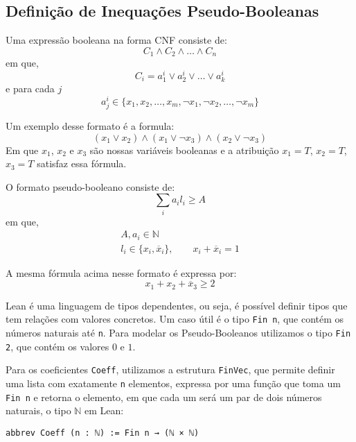 \documentclass[conference]{IEEEtran}
\begin{document}

\subsection{Definição de Inequações Pseudo-Booleanas}
Uma expressão booleana na forma CNF consiste de:
\begin{equation}
    C_1 \land C_2 \land \dots \land C_n
\end{equation}
em que,
\begin{equation}
    C_i = a_1^i \lor a_2^i \lor \dots \lor a_k^i
\end{equation}
e para cada $j$
\begin{equation}
    a_j^i \in \{ x_1,x_2,\dots,x_m,\neg x_1,\neg x_2,\dots, \neg x_m \}
\end{equation}

Um exemplo desse formato é a formula:
\begin{equation}
    (x_1 \lor x_2) \land (x_1 \lor \neg x_3) \land (x_2 \lor \neg x_3)
\end{equation}
Em que $x_1$, $x_2$ e $x_3$ são nossas variáveis booleanas e a atribuição $x_1=T$, $x_2=T$, $x_3=T$ satisfaz essa fórmula.

O formato pseudo-booleano consiste de:
\begin{equation}
    \sum_i{a_i l_i} \ge A
\end{equation}
em que,
\begin{equation}
    \begin{gathered}
        A, a_i \in \mathbb{N} \\
        l_i \in \{ x_i, \overline x_i \}, \qquad x_i + \overline x_i = 1
    \end{gathered}
\end{equation}

A mesma fórmula acima nesse formato é expressa por:
\begin{equation}
    x_1 + x_2 + \overline x_3 \ge 2
\end{equation}

Lean é uma linguagem de tipos dependentes, ou seja, é possível definir tipos que tem relações com valores concretos.
Um caso útil é o tipo \texttt{Fin n}, que contém os números naturais até \texttt{n}.
Para modelar os Pseudo-Booleanos utilizamos o tipo \texttt{Fin 2}, que contém os valores $0$ e $1$.

Para os coeficientes \texttt{Coeff}, utilizamos a estrutura \texttt{FinVec},
que permite definir uma lista com exatamente \texttt{n} elementos,
expressa por uma função que toma um \texttt{Fin n} e retorna o elemento,
em que cada um será um par de dois números naturais, o tipo $\mathbb{N}$ em Lean:
\begin{verbatim}
abbrev Coeff (n : ℕ) := Fin n → (ℕ × ℕ)
\end{verbatim}
\end{document}
